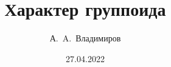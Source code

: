 \documentclass[11pt]{article}
\theoremstyle{plain}
\theoremstyle{definition}
\theoremstyle{remark}
\begin{document}
\author{А.~A.~Владимиров}
\title{Характер группоида}
\date{27.04.2022}
\maketitle



\end{document}

